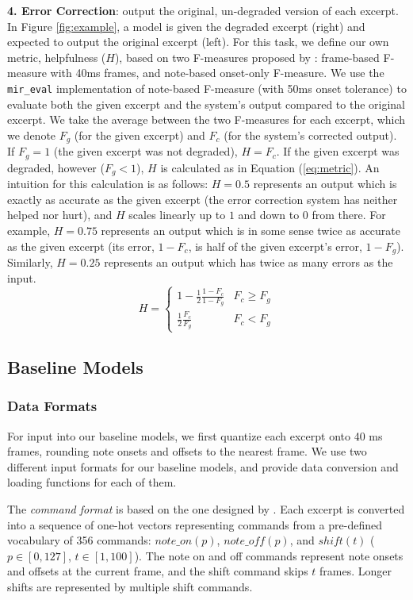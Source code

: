 \documentclass{article}
\begin{document}
\textbf{4. Error Correction}: output the original, un-degraded version of each excerpt. In Figure \ref{fig:example}, a model is given the degraded excerpt (right) and expected to output the original excerpt (left). For this task, we define our own metric, helpfulness ($H$), based on two F-measures proposed by \cite{Bay2009}: frame-based F-measure with 40ms frames, and note-based onset-only F-measure. We use the \mbox{\texttt{mir\_eval}} \cite{mireval} implementation of note-based F-measure (with 50ms onset tolerance) to evaluate both the given excerpt and the system's output compared to the original excerpt. We take the average between the two F-measures for each excerpt, which we denote $F_g$ (for the given excerpt) and $F_c$ (for the system's corrected output). If $F_g = 1$ (the given excerpt was not degraded), $H = F_c$. If the given excerpt was degraded, however ($F_g < 1$), $H$ is calculated as in Equation (\ref{eq:metric}).
An intuition for this calculation is as follows: $H = 0.5$ represents an output which is exactly as accurate as the given excerpt (the error correction system has neither helped nor hurt), and $H$ scales linearly up to $1$ and down to $0$ from there. For example, $H = 0.75$ represents an output which is in some sense twice as accurate as the given excerpt (its error, $1 - F_c$, is half of the given excerpt's error, $1 - F_g$). Similarly, $H = 0.25$ represents an output which has twice as many errors as the input.
\begin{equation}
    H =
    \begin{cases}
        1 - \frac{1}{2}\frac{1 - F_c}{1 - F_g} & F_c \geq F_g \\
        \frac{1}{2}\frac{F_c}{F_g} & F_c < F_g
    \end{cases}
\label{eq:metric}
\end{equation}

\subsection{Baseline Models}
\subsubsection{Data Formats}
For input into our baseline models, we first quantize each excerpt onto 40 ms frames, rounding note onsets and offsets to the nearest frame. We use two different input formats for our baseline models, and provide data conversion and loading functions for each of them. 

The \textit{command format} is based on the one designed by \cite{oore2020time}. Each excerpt is converted into a sequence of one-hot vectors representing commands from a pre-defined vocabulary of 356 commands: $note\_on(p)$, $note\_off(p)$, and $shift(t)$ ($p \in [0, 127]$, $t \in [1, 100]$). The note on and off commands represent note onsets and offsets at the current frame, and the shift command skips $t$ frames. Longer shifts are represented by multiple shift commands.
\end{document}
